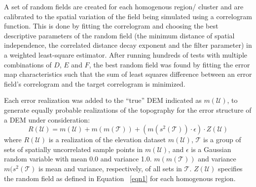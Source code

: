 \documentclass[12pt,letterpaper]{article}
\begin{document}
A set of random fields are created for each homogenous region/ cluster and are calibrated to 
the spatial variation of the field being simulated using a correlogram function. This is done by
fitting the correlogram and choosing the best descriptive parameters
of the random field (the minimum distance of spatial independence, the
correlated distance decay exponent and the filter parameter) in a
weighted least-square estimator.  After running hundreds of tests with
multiple combinations of $D$, $E$ and $F$, the best random field was 
found by fitting the error map characteristics such that the sum of
least squares difference between an error field's correlogram and the
target correlogram is minimized.

Each error realization was added
to the ``true'' DEM indicated as $m(\mathcal{U})$, to generate equally probable realizations of the
topography for the error structure of a DEM under consideration:
\begin{equation}
 R(\mathcal{U})=m(\mathcal{U})+m(m(\mathcal{T}))+(m(s^2(\mathcal{T}))\cdot \epsilon)\cdot Z(\mathcal{U})
\label{eq:one}
\end{equation} 
where $R(\mathcal{U})$ is a realization of the elevation dataset $m(\mathcal{U})$, $\mathcal{T}$ is a
group of sets of spatially uncorrelated sample points in $m(\mathcal{U})$, and $\epsilon$
is a Gaussian random variable with mean 0.0 and variance 1.0. $m(m(\mathcal{T}))$ and
variance $m(s^2(\mathcal{T})$ is mean and variance, respectively, of all sets in 
$\mathcal{T}$. $Z(\mathcal{U})$ specifies the random field as
defined in Equation ~\ref{eqn1} for each homogenous region. 
\end{document}
